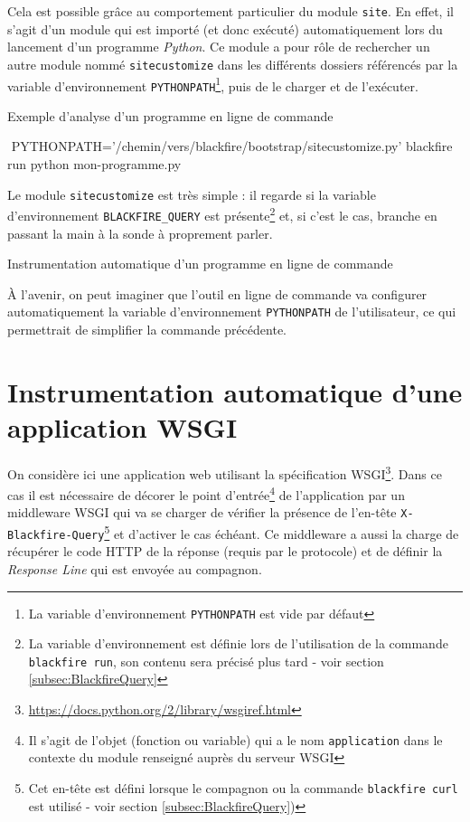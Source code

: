 Cela est possible grâce au comportement particulier du module \verb|site|. En effet, il s'agit d'un module qui est importé (et donc exécuté) automatiquement lors du lancement d'un programme \emph{Python}. Ce module a pour rôle de rechercher un autre module nommé \verb|sitecustomize| dans les différents dossiers référencés par la variable d'environnement \verb|PYTHONPATH|\footnote{La variable d'environnement \verb?PYTHONPATH? est vide par défaut}, puis de le charger et de l'exécuter.

\begin{listing}[H]
\caption{Exemple d'analyse d'un programme en ligne de commande}
\begin{bashcode}
 $ $ PYTHONPATH='/chemin/vers/blackfire/bootstrap/sitecustomize.py' blackfire run python mon-programme.py
\end{bashcode}
\end{listing}

Le module \verb|sitecustomize| est très simple : il regarde si la variable d'environnement \verb|BLACKFIRE_QUERY| est présente\footnote{La variable d'environnement est définie lors de l'utilisation de la commande \verb?blackfire run?, son contenu sera précisé plus tard - voir section \vref{subsec:BlackfireQuery}} et, si c'est le cas, branche \Blackfire en passant la main à la sonde à proprement parler.

\begin{listing}[H]
\caption{Instrumentation automatique d'un programme en ligne de commande}
\end{listing}

\begin{note}
À l'avenir, on peut imaginer que l'outil en ligne de commande \Blackfire va configurer automatiquement la variable d'environnement \verb|PYTHONPATH| de l'utilisateur, ce qui permettrait de simplifier la commande précédente.
\end{note}

\section[Application WSGI]{Instrumentation automatique d'une application WSGI}
On considère ici une application web utilisant la spécification WSGI\footnote{\url{https://docs.python.org/2/library/wsgiref.html}}. Dans ce cas il est nécessaire de décorer le point d'entrée\footnote{Il s'agit de l'objet (fonction ou variable) qui a le nom \verb?application? dans le contexte du module renseigné auprès du serveur WSGI} de l'application par un \gls{middleware} WSGI qui va se charger de vérifier la présence de l'en-tête \verb|X-Blackfire-Query|\footnote{Cet en-tête est défini lorsque le compagnon ou la commande \verb?blackfire curl? est utilisé - voir section \vref{subsec:BlackfireQuery})} et d'activer \Blackfire le cas échéant. Ce middleware a aussi la charge de récupérer le code HTTP de la réponse (requis par le protocole) et de définir la \emph{Response Line} qui est envoyée au compagnon.

